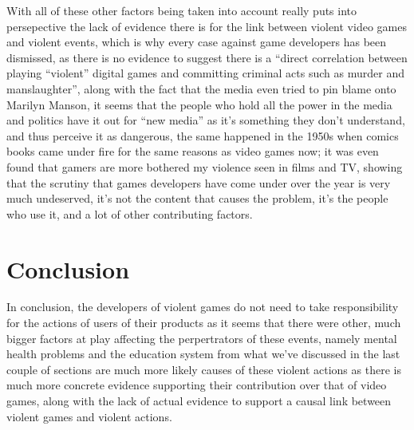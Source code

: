 \documentclass{scrartcl}
\begin{document}
 With all of these other factors being taken into account really puts into persepective the lack of evidence there is for the link between violent video games and violent events, which is why every case against game developers has been dismissed, as there is no evidence to suggest there is a ``direct correlation between playing “violent” digital games and committing criminal acts such as murder and manslaughter''\cite{thayer2007analyzing}, along with the fact that the media even tried to pin blame onto Marilyn Manson\cite{thayer2007analyzing}, it seems that the people who hold all the power in the media and politics have it out for ``new media'' as it's something they don't understand, and thus perceive it as dangerous, the same happened in the 1950s when comics books came under fire for the same reasons as video games now; it was even found that gamers are more bothered my violence seen in films and TV\cite{bbfc}, showing that the scrutiny that games developers have come under over the year is very much undeserved, it's not the content that causes the problem, it's the people who use it, and a lot of other contributing factors. 




\section{Conclusion}
In conclusion, the developers of violent games do not need to take responsibility for the actions of users of their products as it seems that there were other, much bigger factors at play affecting the perpertrators of these events, namely mental health problems and the education system from what we've discussed in the last couple of sections are much more likely causes of these violent actions as there is much more concrete evidence supporting their contribution over that of video games, along with the lack of actual evidence to support a causal link between violent games and violent actions.  









\end{document}
